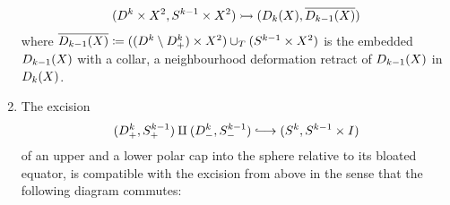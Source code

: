 \begin{Fact}
\begin{enumerate}
    \begin{gather*}
      (D^{k}\times X^2, S^{k-1}\times X^2)
      \rightarrowtail
      (D_{k}({X}), \overline{D_{k-1}({X})})
    \end{gather*}
    where
    $\overline{D_{k-1}({X})}\coloneqq
    ((D^{k}\setminus D^{k}_+)\times X^2)
    \cup_{T}
    (S^{k-1}\times X^2)$
    is the embedded
    $D_{k-1}({X})$ with a collar, \idest a neighbourhood
    deformation retract of $D_{k-1}({X})$ in
    $D_{k}({X})$.
  \item
    The excision
    \begin{gather*}
      (\Disk{k}_+,\Sphere{k-1}_+) \amalg (\Disk{k}_-,\Sphere{k-1}_-)
      \immlongto
      (\Sphere k, \Sphere{k-1}\times I)
    \end{gather*}
    of an upper and a lower polar cap into the sphere relative to its
    bloated equator, is compatible with the excision from above
    in the sense that the following diagram commutes:
    \begin{center}
    \end{center}
  \end{enumerate}
\end{Fact}

